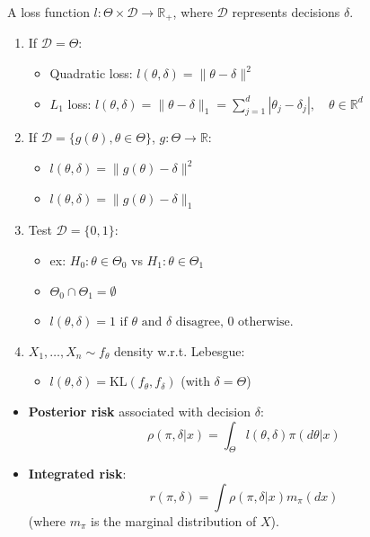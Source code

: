 \documentclass[11pt, a4paper]{article}
\begin{document}
\begin{definition}
A loss function $l: \Theta \times \mathcal{D} \rightarrow \mathbb{R}_+$, where $\mathcal{D}$ represents decisions $\delta$.
\end{definition}

\begin{example}
\begin{enumerate}
    \item If $\mathcal{D} = \Theta$:
    \begin{itemize}
        \item Quadratic loss: $l(\theta,\delta) = \|\theta - \delta\|^2$
        \item $L_1$ loss: $l(\theta,\delta) = \|\theta - \delta\|_1 = \sum_{j=1}^{d} |\theta_j - \delta_j|, \quad \theta \in \mathbb{R}^d$
    \end{itemize}
    \item If $\mathcal{D} = \{g(\theta), \theta \in \Theta\}$, $g: \Theta \rightarrow \mathbb{R}$:
    \begin{itemize}
        \item $l(\theta,\delta) = \|g(\theta) - \delta\|^2$
        \item $l(\theta,\delta) = \|g(\theta) - \delta\|_1$
    \end{itemize}
    \item Test $\mathcal{D} = \{0, 1\}$:
    \begin{itemize}
        \item ex: $H_0: \theta \in \Theta_0$ vs $H_1: \theta \in \Theta_1$
        \item $\Theta_0 \cap \Theta_1 = \emptyset$
        \item $l(\theta,\delta) = 1 \text{ if } \theta \text{ and } \delta \text{ disagree, } 0 \text{ otherwise.}$
    \end{itemize}
    \item $X_1, \dots, X_n \sim f_\theta$ density w.r.t. Lebesgue:
    \begin{itemize}
        \item $l(\theta, \delta) = \text{KL}(f_\theta, f_\delta)$ (with $\delta = \Theta$)
    \end{itemize}
\end{enumerate}
\end{example}

\begin{definition}[Risks]
\begin{itemize}
    \item \textbf{Posterior risk} associated with decision $\delta$:
    \[ \rho(\pi, \delta|x) = \int_{\Theta} l(\theta, \delta) \pi(d\theta|x) \]
    \item \textbf{Integrated risk}:
    \[ r(\pi, \delta) = \int \rho(\pi, \delta|x) m_\pi(dx) \]
    (where $m_\pi$ is the marginal distribution of $X$).
\end{itemize}
\end{definition}
\end{document}
